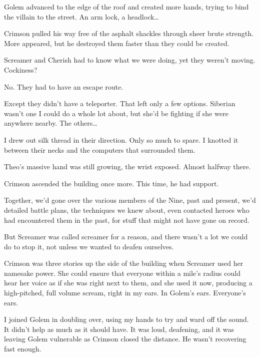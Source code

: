 Golem advanced to the edge of the roof and created more hands, trying to bind the villain to the street.  An arm lock, a headlock\ldots



Crimson pulled his way free of the asphalt shackles through sheer brute strength.  More appeared, but he destroyed them faster than they could be created.



Screamer and Cherish had to know what we were doing, yet they weren't moving.  Cockiness?



No.  They had to have an escape route.



Except they didn't have a teleporter.  That left only a few options.  Siberian wasn't one I could do a whole lot about, but she'd be fighting if she were anywhere nearby.  The others\ldots



I drew out silk thread in their direction.  Only so much to spare.  I knotted it between their necks and the computers that surrounded them.



Theo's massive hand was still growing, the wrist exposed.  Almost halfway there.



Crimson ascended the building once more.  This time, he had support.



Together, we'd gone over the various members of the Nine, past and present, we'd detailed battle plans, the techniques we knew about, even contacted heroes who had encountered them in the past, for stuff that might not have gone on record.



But Screamer was called screamer for a reason, and there wasn't a lot we could do to stop it, not unless we wanted to deafen ourselves.



Crimson was three stories up the side of the building when Screamer used her namesake power.  She could ensure that everyone within a mile's radius could hear her voice as if she was right next to them, and she used it now, producing a high-pitched, full volume scream, right in my ears.  In Golem's ears.  Everyone's ears.



I joined Golem in doubling over, using my hands to try and ward off the sound.  It didn't help as much as it should have.  It was loud, deafening, and it was leaving Golem vulnerable as Crimson closed the distance.  He wasn't recovering fast enough.



